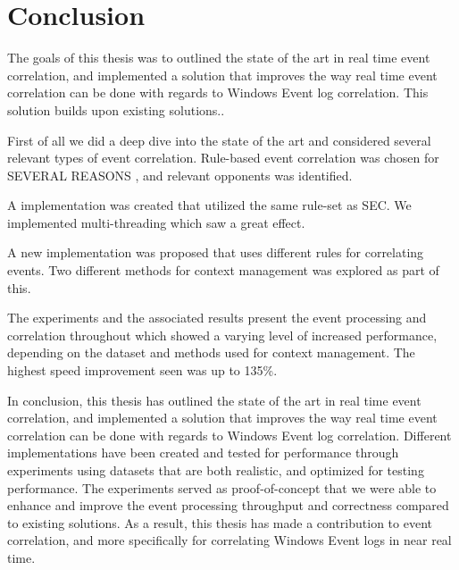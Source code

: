 \chapter{Conclusion}
\label{chap:conclusion}

\iffalse
Minioppsummering, med fokus på konsekvenser, konkludere om du har besvart RQ.

Her skal det ikke introduseres noe nytt! Trekker sammen de viktige tingene til slutt.

Inneholder også future work, her kan du utdype litt, men ingenting "nytt" her.


The primary contribution of this project is an improved method for correlating Windows Event Logs in time, in near real time. The goal of this thesis is to explore ways to improve real time log correlation both performance-wise but also addressing the problems that occur when analyzing asynchronous events or when experiencing log ingestion delays.
\fi
The goals of this thesis was to outlined the state of the art in real time event correlation, and implemented a solution that improves the way real time event correlation can be done with regards to Windows Event log correlation. This solution builds upon existing solutions.. 

First of all we did a deep dive into the state of the art and considered several relevant types of event correlation. Rule-based event correlation was chosen for SEVERAL REASONS , and relevant opponents was identified. 

A implementation was created that utilized the same rule-set as SEC. We implemented multi-threading which saw a great effect. 

A new implementation was proposed that uses different rules for correlating events. Two different methods for context management was explored as part of this. 

The experiments and the associated results present the event processing and correlation throughout which showed a varying level of increased performance, depending on the dataset and methods used for context management. The highest speed improvement seen was up to 135\%. 

In conclusion, this thesis has outlined the state of the art in real time event correlation, and implemented a solution that improves the way real time event correlation can be done with regards to Windows Event log correlation.
Different implementations have been created and tested for performance through experiments using datasets that are both realistic, and optimized for testing performance. The experiments served as proof-of-concept that we were able to enhance and improve the event processing throughput and correctness compared to existing solutions. As a result, this thesis has made a contribution to event correlation, and more specifically for correlating Windows Event logs in near real time.